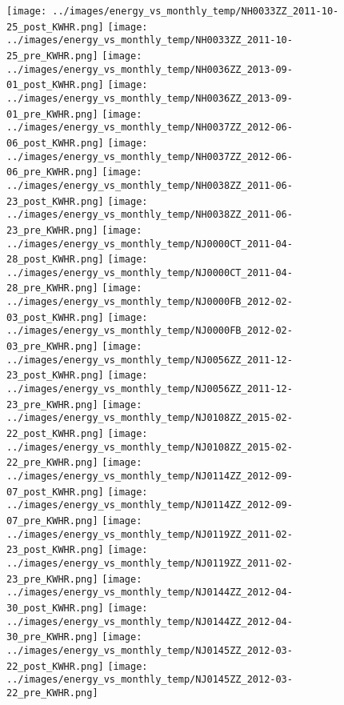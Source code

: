 \clearpage
\begin{figure}
\centering
\texttt{[image: ../images/energy\_vs\_monthly\_temp/NH0033ZZ\_2011-10-25\_post\_KWHR.png]}
\texttt{[image: ../images/energy\_vs\_monthly\_temp/NH0033ZZ\_2011-10-25\_pre\_KWHR.png]}
\texttt{[image: ../images/energy\_vs\_monthly\_temp/NH0036ZZ\_2013-09-01\_post\_KWHR.png]}
\texttt{[image: ../images/energy\_vs\_monthly\_temp/NH0036ZZ\_2013-09-01\_pre\_KWHR.png]}
\texttt{[image: ../images/energy\_vs\_monthly\_temp/NH0037ZZ\_2012-06-06\_post\_KWHR.png]}
\texttt{[image: ../images/energy\_vs\_monthly\_temp/NH0037ZZ\_2012-06-06\_pre\_KWHR.png]}
\texttt{[image: ../images/energy\_vs\_monthly\_temp/NH0038ZZ\_2011-06-23\_post\_KWHR.png]}
\texttt{[image: ../images/energy\_vs\_monthly\_temp/NH0038ZZ\_2011-06-23\_pre\_KWHR.png]}
\texttt{[image: ../images/energy\_vs\_monthly\_temp/NJ0000CT\_2011-04-28\_post\_KWHR.png]}
\texttt{[image: ../images/energy\_vs\_monthly\_temp/NJ0000CT\_2011-04-28\_pre\_KWHR.png]}
\texttt{[image: ../images/energy\_vs\_monthly\_temp/NJ0000FB\_2012-02-03\_post\_KWHR.png]}
\texttt{[image: ../images/energy\_vs\_monthly\_temp/NJ0000FB\_2012-02-03\_pre\_KWHR.png]}
\texttt{[image: ../images/energy\_vs\_monthly\_temp/NJ0056ZZ\_2011-12-23\_post\_KWHR.png]}
\texttt{[image: ../images/energy\_vs\_monthly\_temp/NJ0056ZZ\_2011-12-23\_pre\_KWHR.png]}
\texttt{[image: ../images/energy\_vs\_monthly\_temp/NJ0108ZZ\_2015-02-22\_post\_KWHR.png]}
\texttt{[image: ../images/energy\_vs\_monthly\_temp/NJ0108ZZ\_2015-02-22\_pre\_KWHR.png]}
\texttt{[image: ../images/energy\_vs\_monthly\_temp/NJ0114ZZ\_2012-09-07\_post\_KWHR.png]}
\texttt{[image: ../images/energy\_vs\_monthly\_temp/NJ0114ZZ\_2012-09-07\_pre\_KWHR.png]}
\texttt{[image: ../images/energy\_vs\_monthly\_temp/NJ0119ZZ\_2011-02-23\_post\_KWHR.png]}
\texttt{[image: ../images/energy\_vs\_monthly\_temp/NJ0119ZZ\_2011-02-23\_pre\_KWHR.png]}
\texttt{[image: ../images/energy\_vs\_monthly\_temp/NJ0144ZZ\_2012-04-30\_post\_KWHR.png]}
\texttt{[image: ../images/energy\_vs\_monthly\_temp/NJ0144ZZ\_2012-04-30\_pre\_KWHR.png]}
\texttt{[image: ../images/energy\_vs\_monthly\_temp/NJ0145ZZ\_2012-03-22\_post\_KWHR.png]}
\texttt{[image: ../images/energy\_vs\_monthly\_temp/NJ0145ZZ\_2012-03-22\_pre\_KWHR.png]}
\end{figure}
